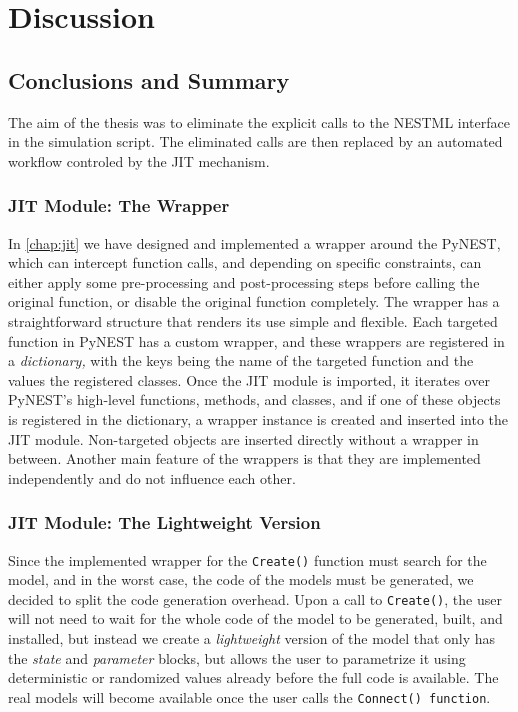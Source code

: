 \chapter{Discussion}
 \label{chap:disc}
 \section{Conclusions and Summary}

The aim of the thesis was to eliminate the explicit calls to the NESTML interface in the simulation script. The eliminated calls are then replaced by an automated workflow controled by the JIT mechanism.

\subsection*{JIT Module: The Wrapper}

In \autoref{chap:jit} we have designed and implemented a wrapper around the PyNEST, which can intercept function calls, and depending on specific constraints, can either apply some pre-processing and post-processing steps before calling the original function, or disable the original function completely. The wrapper has a straightforward structure that renders its use simple and flexible. Each targeted function in PyNEST has a custom wrapper, and these wrappers are registered in a \emph{dictionary,} with the keys being the name of the targeted function and the values the registered classes. Once the JIT module is imported, it iterates over PyNEST's high-level functions, methods, and classes, and if one of these objects is registered in the dictionary, a wrapper instance is created and inserted into the JIT module. Non-targeted objects are inserted directly without a wrapper in between. Another main feature of the wrappers is that they are implemented independently and do not influence each other.

\subsection*{JIT Module: The Lightweight Version}

Since the implemented wrapper for the \texttt{Create()} function must search for the model, and in the worst case, the code of the models must be generated, we decided to split the code generation overhead. Upon a call to \texttt{Create()}, the user will not need to wait for the whole code of the model to be generated, built, and installed, but instead we create a \emph{lightweight} version of the model that only has the \emph{state} and \emph{parameter} blocks, but allows the user to parametrize it using deterministic or randomized values already before the full code is available. The real models will become available once the user calls the \texttt{Connect() function}.

